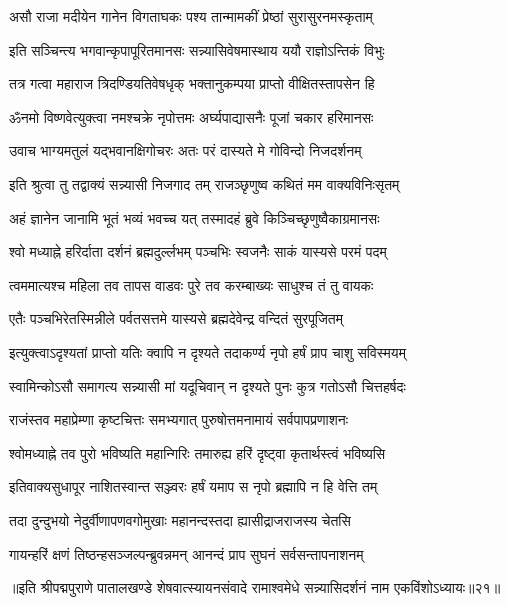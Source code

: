 \twolineshloka
{असौ राजा मदीयेन गानेन विगताघकः}
{पश्य तान्मामकीं प्रेष्ठां सुरासुरनमस्कृताम्}%

\twolineshloka
{इति सञ्चिन्त्य भगवान्कृपापूरितमानसः}
{सन्न्यासिवेषमास्थाय ययौ राज्ञोऽन्तिकं विभुः}%

\twolineshloka
{तत्र गत्वा महाराज त्रिदण्डियतिवेषधृक्}
{भक्तानुकम्पया प्राप्तो वीक्षितस्तापसेन हि}%

\twolineshloka
{ॐनमो विष्णवेत्युक्त्वा नमश्चक्रे नृपोत्तमः}
{अर्घ्यपाद्यासनैः पूजां चकार हरिमानसः}%

\twolineshloka
{उवाच भाग्यमतुलं यद्भवानक्षिगोचरः}
{अतः परं दास्यते मे गोविन्दो निजदर्शनम्}%

\twolineshloka
{इति श्रुत्वा तु तद्वाक्यं सन्न्यासी निजगाद तम्}
{राजञ्छृणुष्व कथितं मम वाक्यविनिःसृतम्}%

\twolineshloka
{अहं ज्ञानेन जानामि भूतं भव्यं भवच्च यत्}
{तस्मादहं ब्रुवे किञ्चिच्छृणुष्वैकाग्रमानसः}%

\twolineshloka
{श्वो मध्याह्ने हरिर्दाता दर्शनं ब्रह्मदुर्ल्लभम्}
{पञ्चभिः स्वजनैः साकं यास्यसे परमं पदम्}%

\twolineshloka
{त्वममात्यश्च महिला तव तापस वाडवः}
{पुरे तव करम्बाख्यः साधुश्च तं तु वायकः}%

\twolineshloka
{एतैः पञ्चभिरेतस्मिन्नीले पर्वतसत्तमे}
{यास्यसे ब्रह्मदेवेन्द्र वन्दितं सुरपूजितम्}%

\twolineshloka
{इत्युक्त्वाऽदृश्यतां प्राप्तो यतिः क्वापि न दृश्यते}
{तदाकर्ण्य नृपो हर्षं प्राप चाशु सविस्मयम्}%


\twolineshloka
{स्वामिन्कोऽसौ समागत्य सन्न्यासी मां यदूचिवान्}
{न दृश्यते पुनः कुत्र गतोऽसौ चित्तहर्षदः}%


\twolineshloka
{राजंस्तव महाप्रेम्णा कृष्टचित्तः समभ्यगात्}
{पुरुषोत्तमनामायं सर्वपापप्रणाशनः}%

\twolineshloka
{श्वोमध्याह्ने तव पुरो भविष्यति महान्गिरिः}
{तमारुह्य हरिं दृष्ट्वा कृतार्थस्त्वं भविष्यसि}%

\twolineshloka
{इतिवाक्यसुधापूर नाशितस्वान्त सञ्ज्वरः}
{हर्षं यमाप स नृपो ब्रह्मापि न हि वेत्ति तम्}%

\twolineshloka
{तदा दुन्दुभयो नेदुर्वीणापणवगोमुखाः}
{महानन्दस्तदा ह्यासीद्राजराजस्य चेतसि}%

\twolineshloka
{गायन्हरिं क्षणं तिष्ठन्हसञ्जल्पन्ब्रुवन्नमन्}
{आनन्दं प्राप सुघनं सर्वसन्तापनाशनम्}%

॥इति श्रीपद्मपुराणे पातालखण्डे शेषवात्स्यायनसंवादे रामाश्वमेधे सन्न्यासिदर्शनं नाम एकविंशोऽध्यायः॥२१॥

